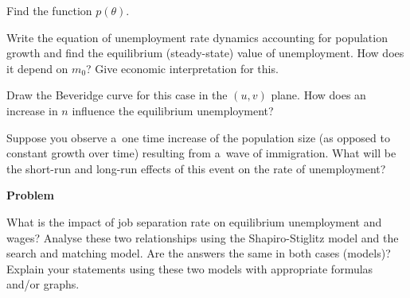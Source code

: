 \documentclass[a4paper, notitlepage, 11pt]{article}
\newcounter{zadlicz}[section]%
\newcommand{\tytul}[2]{\setcounter{equation}{0}\addtocounter{zadlicz}{1}\vspace{\abovedisplayskip}\noindent\textbf{#1\ \thezadlicz #2}}%
\begin{document}
\begin{wylicz}
\item Find the function $p(\theta)$.
\item Write the equation of unemployment rate dynamics accounting for population growth and find the equilibrium (steady-state) value of unemployment. How does it depend on $m_0$? Give economic interpretation for this.
\item Draw the Beveridge curve for this case in the $(u,v)$ plane. How does an increase in $n$ influence the equilibrium unemployment?
\item Suppose you observe a~one time increase of the population size (as opposed to constant growth over time) resulting from a~wave of immigration. What will be the short-run and long-run effects of this event on the rate of unemployment?
\end{wylicz}


\tytul{Problem}{}

\noindent%
What is the impact of job separation rate on equilibrium unemployment and wages? Analyse these two
relationships using the Shapiro-Stiglitz model and the search and matching model. Are the answers
the same in both cases (models)? Explain your statements using these two models with appropriate
formulas and/or graphs.

\end{document}

